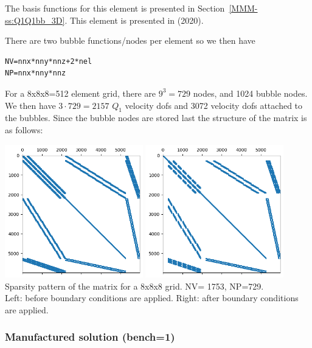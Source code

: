 
The basis functions for this element is presented in Section~\ref{MMM-ss:Q1Q1bb_3D}.
This element is presented in \textcite{kahp20} (2020). 

There are two bubble functions/nodes per element so we then have 
\begin{lstlisting}
NV=nnx*nny*nnz+2*nel 
NP=nnx*nny*nnz
\end{lstlisting}
For a 8x8x8=512 element grid, there are $9^3=729$ nodes, and 1024 bubble nodes.
We then have $3\cdot 729=2157$ $Q_1$ velocity dofs and 3072 velocity dofs attached 
to the bubbles.
Since the bubble nodes are stored last the structure of the matrix is as follows:
\begin{center}
\includegraphics[width=6cm]{python_codes/fieldstone_82/results/matrix_8x8x8_bef_bc}
\includegraphics[width=6cm]{python_codes/fieldstone_82/results/matrix_8x8x8_aft_bc}\\
{\captionfont Sparsity pattern of the matrix for a 8x8x8 grid.
NV= 1753, NP=729.\\ Left:
before boundary conditions are applied. 
Right: after boundary conditions are applied.} 
\end{center}


\subsubsection*{Manufactured solution (bench=1)}

